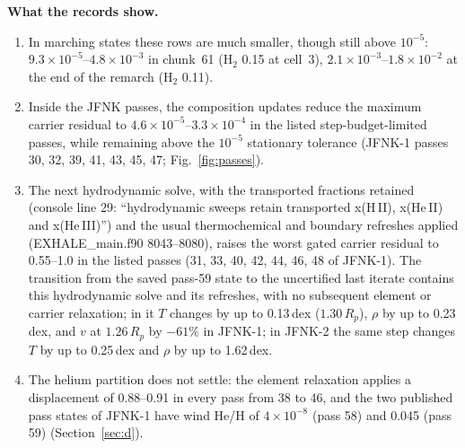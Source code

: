 \documentclass[english,a4paper]{my_memo}
\newcommand{\Rp}{R_p}
\begin{document}
\textbf{What the records show.}
\begin{enumerate}
\item In marching states these rows are much smaller, though still above
$10^{-5}$: $9.3\times10^{-5}$--$4.8\times10^{-3}$ in chunk~61 (H$_2$ 0.15 at
cell~3), $2.1\times10^{-3}$--$1.8\times10^{-2}$ at the end of the remarch
(H$_2$ 0.11).
\item Inside the JFNK passes, the composition updates reduce the maximum
carrier residual to $4.6\times10^{-5}$--$3.3\times10^{-4}$ in the listed
step-budget-limited passes, while remaining above the $10^{-5}$ stationary
tolerance (JFNK-1 passes 30, 32, 39, 41, 43, 45, 47; Fig.~\ref{fig:passes}).
\item The next hydrodynamic solve, with the transported fractions retained
(console line 29: ``hydrodynamic sweeps retain transported x(H\,II),
x(He\,II) and x(He\,III)'') and the usual thermochemical and boundary
refreshes applied (EXHALE\_main.f90 8043--8080), raises the worst gated
carrier residual to 0.55--1.0 in the listed passes (31, 33, 40, 42, 44,
46, 48 of JFNK-1). The transition from the saved pass-59 state to the
uncertified last iterate contains this hydrodynamic solve and its
refreshes, with no subsequent element or carrier relaxation; in it $T$
changes by up to
0.13\,dex ($1.30\,\Rp$), $\rho$ by up to 0.23\,dex, and $v$ at
$1.26\,\Rp$ by $-61\%$ in JFNK-1; in JFNK-2 the same step changes $T$ by up
to 0.25\,dex and $\rho$ by up to 1.62\,dex.
\item The helium partition does not settle: the element relaxation applies
a displacement of 0.88--0.91 in every pass from 38 to 46, and the two
published pass states of JFNK-1 have wind He/H of $4\times10^{-8}$ (pass
58) and 0.045 (pass 59) (Section~\ref{sec:d}).
\end{enumerate}
\end{document}
